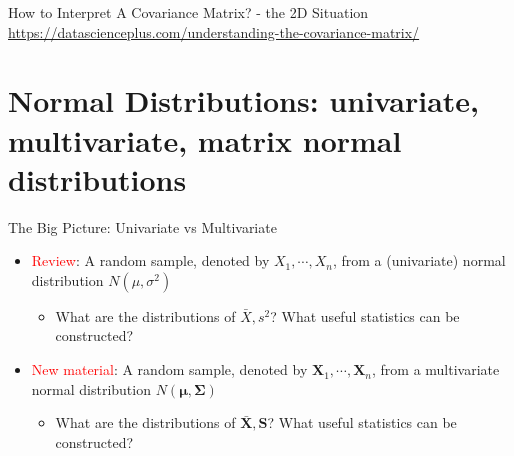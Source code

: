 \documentclass[
  ignorenonframetext,
]{beamer}
\providecommand{\tightlist}{%
  \setlength{\itemsep}{0pt}\setlength{\parskip}{0pt}}
\begin{document}
\begin{frame}{How to Interpret A Covariance Matrix? - the 2D Situation}
\protect\hypertarget{how-to-interpret-a-covariance-matrix---the-2d-situation}{}
\url{https://datascienceplus.com/understanding-the-covariance-matrix/}
\end{frame}

\hypertarget{normal-distributions-univariate-multivariate-matrix-normal-distributions}{%
\section{Normal Distributions: univariate, multivariate, matrix normal
distributions}\label{normal-distributions-univariate-multivariate-matrix-normal-distributions}}

\begin{frame}{The Big Picture: Univariate vs Multivariate}
\protect\hypertarget{the-big-picture-univariate-vs-multivariate}{}
\begin{itemize}
\tightlist
\item
  \textcolor{red}{Review}: A random sample, denoted by
  \(X_1, \cdots, X_n\), from a (univariate) normal distribution
  \(N(\mu, \sigma^2)\)

  \begin{itemize}
  \tightlist
  \item
    What are the distributions of \(\bar X, s^2\)? What useful
    statistics can be constructed?
  \end{itemize}
\item
  \textcolor{red}{New material}: A random sample, denoted by
  \(\mathbf X_1, \cdots, \mathbf X_n\), from a multivariate normal
  distribution \(N(\boldsymbol \mu, \boldsymbol \Sigma)\)

  \begin{itemize}
  \tightlist
  \item
    What are the distributions of \(\bar{\mathbf X}, \mathbf S\)? What
    useful statistics can be constructed?
  \end{itemize}
\end{itemize}
\end{frame}
\end{document}
